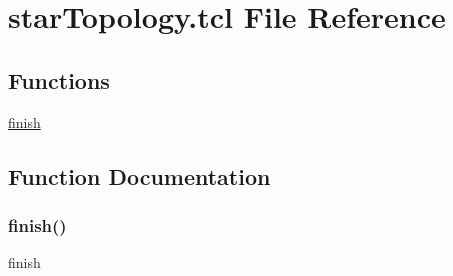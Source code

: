 \hypertarget{star_topology_8tcl}{}\section{star\+Topology.\+tcl File Reference}
\label{star_topology_8tcl}
\subsection*{Functions}
\begin{DoxyCompactItemize}
\item 
\hyperlink{star_topology_8tcl_a30728837c246b65ef76298af0101d99c}{finish}
\end{DoxyCompactItemize}


\subsection{Function Documentation}
\mbox{\label{star_topology_8tcl_a30728837c246b65ef76298af0101d99c}} 
\subsubsection{\texorpdfstring{finish()}{finish()}}
{\footnotesize\ttfamily finish}

